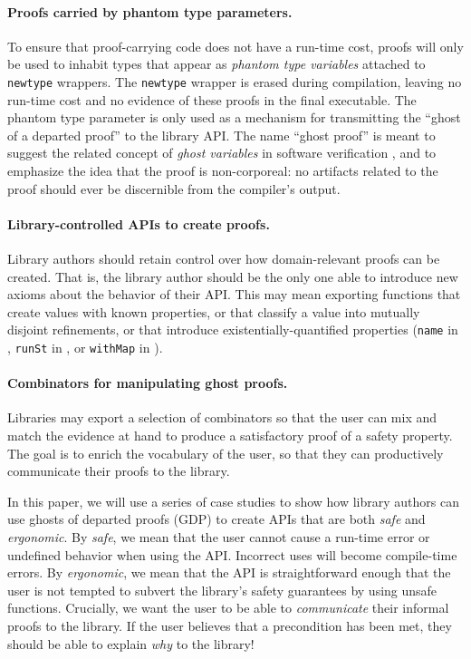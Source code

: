 \documentclass[format=sigplan, review=false, screen=true, 10pt]{acmart}
\makeatletter
\let\origsubsection\subsection
\renewcommand\subsection{\@ifstar{\starsubsection}{\nostarsubsection}}
\newcommand\nostarsubsection[1]
{\subsectionprelude\origsubsection{#1}\subsectionpostlude}
\newcommand\starsubsection[1]
{\subsectionprelude\origsubsection*{#1}\subsectionpostlude}
\newcommand\subsectionprelude{%
  \vspace{-0.25em}
}
\newcommand\subsectionpostlude{%
  \vspace{-0.05em}
}
\makeatother
\begin{document}
\paragraph{Proofs carried by phantom type parameters.}
  To ensure that proof-carrying code does not have a run-time cost, proofs will only
  be used to inhabit types that appear as \emph{phantom type variables} attached to
  \texttt{newtype} wrappers.
  The \texttt{newtype} wrapper is erased during compilation, leaving no run-time cost and
  no evidence of these proofs in the final executable.
  The phantom type parameter is only used as a mechanism for transmitting the
  ``ghost of a departed proof'' to the library API.
  The name ``ghost proof'' is meant to suggest the related concept of \emph{ghost variables} in software
  verification \cite{leavens1999jml}, and to emphasize the idea that the proof is non-corporeal: no
  artifacts related to the proof should ever be discernible from the compiler's output.
\paragraph{Library-controlled APIs to create proofs.}
  Library authors should retain control over how domain-relevant proofs can be created.
  That is, the library author should be the only one able to introduce new axioms about
  the behavior of their API.
  This may mean exporting functions that create values with known properties, or that
  classify a value into mutually disjoint refinements,
or that introduce existentially-quantified properties (\texttt{name} in , \texttt{runSt} in , or \texttt{withMap}
in ).
\paragraph{Combinators for manipulating ghost proofs.}
  Libraries may export a selection of combinators so that the user can
  mix and match the evidence at hand to produce a satisfactory proof of a
  safety property. The goal is to enrich the vocabulary of the user, so
  that they can productively communicate their proofs to the library.


\subsection{The structure of this paper}
In this paper, we will use a series of case studies to show how library authors can use
ghosts of departed proofs (GDP) to create
APIs that are both \emph{safe} and \emph{ergonomic}. By \emph{safe}, we mean that the
user cannot cause a run-time error or undefined behavior when using the API. Incorrect uses
will become compile-time errors. By \emph{ergonomic}, we mean that the API is straightforward
enough that the user is not tempted to subvert the library's safety guarantees by using
unsafe functions. Crucially, we want the user to be able to \emph{communicate} their
informal proofs to the library. If the user believes that a precondition has been met,
they should be able to explain \emph{why} to the library!
\end{document}
